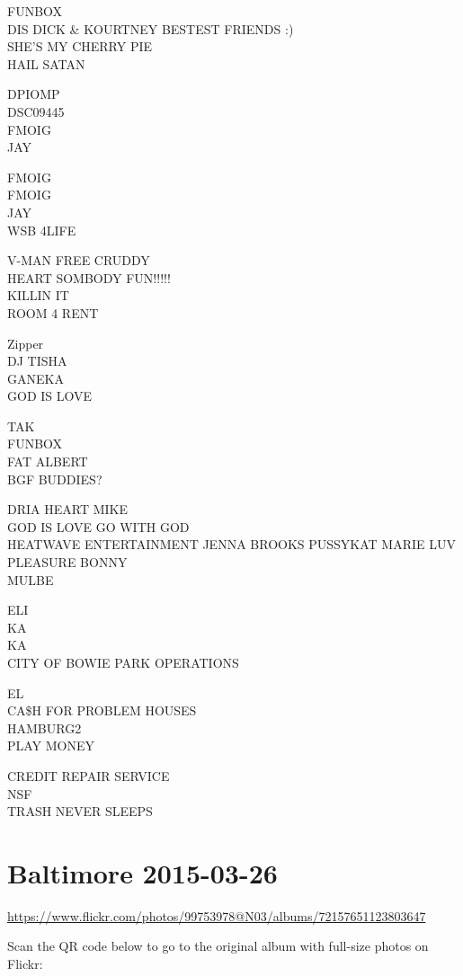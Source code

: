\documentclass[10pt,letterpaper]{article}
\begin{document}
FUNBOX\\
DIS DICK \& KOURTNEY BESTEST FRIENDS :)\\
SHE'S MY CHERRY PIE\\
HAIL SATAN

DPIOMP\\
DSC09445\\
FMOIG\\
JAY

FMOIG\\
FMOIG\\
JAY\\
WSB 4LIFE

V{-}MAN FREE CRUDDY\\
HEART SOMBODY FUN!!!!!\\
KILLIN IT\\
ROOM 4 RENT

Zipper\\
DJ TISHA\\
GANEKA\\
GOD IS LOVE

TAK\\
FUNBOX\\
FAT ALBERT\\
BGF BUDDIES?

DRIA HEART MIKE\\
GOD IS LOVE GO WITH GOD\\
HEATWAVE ENTERTAINMENT JENNA BROOKS PUSSYKAT MARIE LUV PLEASURE BONNY\\
MULBE

ELI\\
KA\\
KA\\
CITY OF BOWIE PARK OPERATIONS

EL\\
CA\$H FOR PROBLEM HOUSES\\
HAMBURG2\\
PLAY MONEY

CREDIT REPAIR SERVICE\\
NSF\\
TRASH NEVER SLEEPS


\section*{Baltimore 2015-03-26}

\url{https://www.flickr.com/photos/99753978@N03/albums/72157651123803647}

Scan the QR code below to go to the original album with full-size photos on Flickr:
\end{document}
